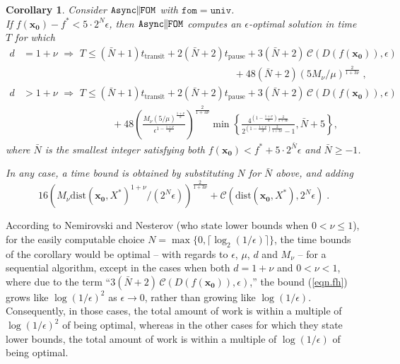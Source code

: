\documentclass[reqno, 11pt]{amsart}
\newtheorem{cor}[prop]{Corollary}
\numberwithin{equation}{section}
\newcommand{\nt}{\negthinspace}
\newcommand{\fom}{\mathtt{fom}}
\newcommand{\parfom}{\parallel \nt \nt  \mathtt{FOM}}
\newcommand{\univ}{\mathtt{univ}}
\newcommand{\tpause}{t_{\mathrm{pause}}}
\newcommand{\ttransit}{t_{\mathrm{transit}}}
\newcommand{\aparfom}{\mathtt{Async} \nt \nt \parfom}
\newcommand{\dist}{\mathrm{dist}}
\begin{document}
\begin{cor}  \label{cor.hb} 
Consider $ \aparfom $ with $ \fom = \univ $.  \\
If $ f(\mathbf{x_0}) - f^* < 5 \cdot 2^{N} \epsilon $, then $ \aparfom $ computes an $ \epsilon$-optimal solution in time $ T $ for which 
\begin{align}
  d & = 1 + \nu   \, \,   \Rightarrow \, \,   T \leq (\bar{N}+1) \ttransit  + 2(\bar{N}+2) \tpause + 3(\bar{N}+2) \, {\mathcal C} ( D(f(\mathbf{x_0})), \epsilon) \nonumber \\
&\qquad  \qquad  \qquad  \qquad  \qquad  \qquad  \qquad  \qquad  \qquad  \qquad  \quad  \, \, 
      +  48  (\bar{N} + 2)  \left( 5 M_{\nu}/ \mu \right)^{\frac{2}{1 + 3 \nu}}  \; ,  \label{eqn.hh}  \\
  d &>  1 + \nu \, \,  \Rightarrow \, \,  T \leq (\bar{N}+1) \ttransit  + 2(\bar{N}+2) \tpause + 3(\bar{N}+2) \, {\mathcal C} ( D(f(\mathbf{x_0})), \epsilon)  \nonumber \\
& \quad \qquad  \qquad  \qquad \qquad  +  48 \left( \frac{M_{\nu} (5  / \mu)^{\frac{1 + \nu}{d}}}{\epsilon^{1 - \frac{1 + \nu}{d}}}\right)^{\frac{2}{1 + 3 \nu}} 
 \min \left\{ \frac{4^{(1 - \frac{1 + \nu}{d}) \frac{2}{1 + 3 \nu}}}{2^{(1 - \frac{1 + \nu}{d})\frac{2}{1 + 3 \nu} } - 1}, \bar{N} + 5 \right\}, \label{eqn.hi} 
  \end{align}
where  $ \bar{N} $ is the smallest integer satisfying both $ f( \mathbf{x_0}) < f^* + 5 \cdot 2^{\bar{N}} \epsilon $ and $ \bar{N} \geq -1 $. 

In any case, a time bound is obtained by substituting $ N $ for $ \bar{N} $ above, and adding 
\begin{equation}  \label{eqn.hj} 
16 \left( M_{\nu} \dist( \mathbf{x_0}, X^*)^{1 + \nu}/ (2^N \epsilon) \right)^{\frac{2}{1 + 3 \nu}} + {\mathcal C} ( \dist(\mathbf{x_0},X^*), 2^N \epsilon) \; . 
 \end{equation}    
    \end{cor} 
    \vspace{2mm}

According to Nemirovski and Nesterov \cite[page 6]{NemNes85} (who state lower bounds when $ 0 < \nu \leq 1 $), for   the easily computable choice $ N = \max \{ 0, \lceil \log_2(1/ \epsilon) \rceil \} $, the time bounds of the corollary would be optimal  -- with regards to $ \epsilon $, $ \mu $, $ d $ and $ M_{ \nu} $  -- for a sequential algorithm, except in the cases when both $ d = 1 + \nu $ and $ 0 < \nu < 1 $, where due to the term ``$ 3( \bar{N}+2) \, {\mathcal C} (D(f( \mathbf{x_0})), \epsilon )  $,'' the bound (\ref{eqn.fh})  grows like $ \log(1/\epsilon)^2 $ as $ \epsilon \rightarrow 0 $, rather than growing like $ \log(1/\epsilon) $. Consequently, in those cases, the total amount of work is within a multiple of $ \log(1/\epsilon)^2 $ of being optimal, whereas in the other cases for which they state lower bounds, the total amount of work is within a multiple of $ \log(1/\epsilon) $ of being optimal.
\vspace{2mm}
\end{document}
